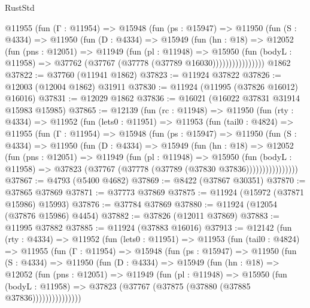 \begin{lexlean}{RustStd}
\begin{coremodule}
{\begin{coremodule}
{{{{{{{{{{{{{{{{{{{{{{{{{{{{{{{{{{{{{{{{{{{{{{{{{{{{{{{{{{{{{{{{{{{{{{{{{{{{{{{{            @11955
              (fun (Γ : @11954) =>
              @15948
                (fun (ps : @15947) =>
                @11950
                  (fun (S : @4334) =>
                  @11950
                    (fun (D : @4334) =>
                    @15949
                      (fun (hn : @18) =>
                      @12052
                        (fun (pns : @12051) =>
                        @11949
                          (fun (pl : @11948) =>
                          @15950
                            (fun (bodyL : @11958) =>
                            @37762 (@37767 (@37778 (@37789 @16030))))))))))))))))
    @1862
@37822 := @37760 (@11941 @1862)
@37823 := @11924 @37822
@37826 := @12003 (@12004 @1862) @31911
@37830 := @11924 (@11995 (@37826 @16012) @16016)
@37831 := @12029 @1862
@37836 := @16021 (@16022 @37831 @31914 @15983 @15985)
@37865 := @12139
    (fun (rc : @11948) =>
    @11950
      (fun (rty : @4334) =>
      @11952
        (fun (lets0 : @11951) =>
        @11953
          (fun (tail0 : @4824) =>
          @11955
            (fun (Γ : @11954) =>
            @15948
              (fun (ps : @15947) =>
              @11950
                (fun (S : @4334) =>
                @11950
                  (fun (D : @4334) =>
                  @15949
                    (fun (hn : @18) =>
                    @12052
                      (fun (pns : @12051) =>
                      @11949
                        (fun (pl : @11948) =>
                        @15950
                          (fun (bodyL : @11958) =>
                          @37823 (@37767 (@37778 (@37789 (@37830 @37836))))))))))))))))
@37867 := @4793 (@5400 @4682)
@37869 := @8422 (@37867 @30351)
@37870 := @37865 @37869
@37871 := @37773 @37869
@37875 := @11924 (@15972 (@37871 @15986) @15993)
@37876 := @37784 @37869
@37880 := @11924 (@12054 (@37876 @15986) @4454)
@37882 := @37826 (@12011 @37869)
@37883 := @11995 @37882
@37885 := @11924 (@37883 @16016)
@37913 := @12142
    (fun (rty : @4334) =>
    @11952
      (fun (lets0 : @11951) =>
      @11953
        (fun (tail0 : @4824) =>
        @11955
          (fun (Γ : @11954) =>
          @15948
            (fun (ps : @15947) =>
            @11950
              (fun (S : @4334) =>
              @11950
                (fun (D : @4334) =>
                @15949
                  (fun (hn : @18) =>
                  @12052
                    (fun (pns : @12051) =>
                    @11949
                      (fun (pl : @11948) =>
                      @15950
                        (fun (bodyL : @11958) =>
                        @37823 (@37767 (@37875 (@37880 (@37885 @37836)))))))))))))))
}}}}}}}}}}}}}}}}}}}}}}}}}}}}}}}}}}}}}}}}}}}}}}}}}}}}}}}}}}}}}}}}}}}}}}}}}}}}}}}}
\end{coremodule}}
\end{coremodule}
\end{lexlean}
